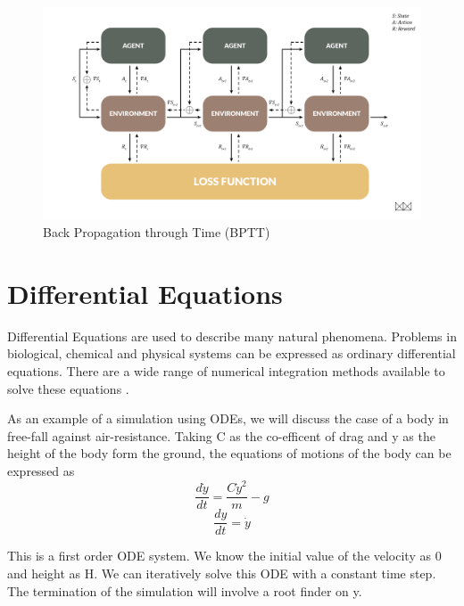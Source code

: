 \documentclass{juliacon}
\begin{document}
\begin{figure}[!htb]
    \centering
    \includegraphics[width=\textwidth]{images/bptt.png}
    \caption{Back Propagation through Time (BPTT)}
    \label{fig:bptt}
\end{figure}

\section{Differential Equations}
\label{sec:trebuchet}

Differential Equations are used to describe many natural phenomena. Problems in biological, chemical and physical systems can be expressed as ordinary differential equations. There are a wide range of numerical integration methods available to solve these equations \cite{DifferentialEquations.jl-2017}.


As an example of a simulation using ODEs, we will discuss the case of a body in free-fall against air-resistance. Taking C as the co-efficent of drag and y as the height of the body form the ground, the equations of motions of the body can be expressed as     
    \begin{equation}
        \label{free-fall1}
        \frac{d\dot{y}}{dt} = \frac{C\dot{y}^2}{m} - g
    \end{equation}
    \begin{equation}
        \label{free-fall2}
        \frac{dy}{dt} = \dot{y}
    \end{equation}
    
This is a first order ODE system. We know the initial value of the velocity as 0 and height as H. We can iteratively solve this ODE with a constant time step. The termination of the simulation will involve a root finder on y.
\end{document}
